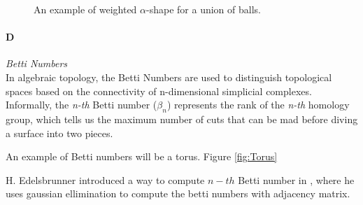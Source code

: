 \documentclass[11pt]{article}
\begin{document}
\begin{figure}
	\caption{\label{fig:Dual Shape} An example of weighted $\alpha$-shape for a union of balls. \cite{DualShape}}
\end{figure}

\paragraph{D} \emph{Betti Numbers} \hfill \\
\indent In algebraic topology, the Betti Numbers are used to distinguish topological spaces based on the connectivity of n-dimensional simplicial complexes. Informally, the \emph{n-th} Betti number ($\beta_n$) represents the rank of the \emph{n-th} homology group, which tells us the maximum number of cuts that can be mad before diving a surface into two pieces. \cite{betti wiki}

\indent An example of Betti numbers will be a torus. Figure \ref{fig:Torus}

\indent H. Edelsbrunner introduced a way to compute $n-th$ Betti number in \cite{Edel Book}, where he uses gaussian ellimination to compute the betti numbers with adjacency matrix.
\end{document}

